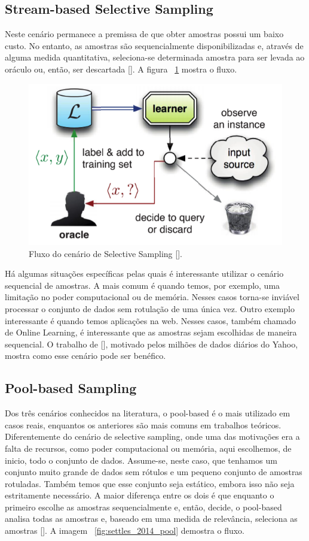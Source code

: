 \subsection{Stream-based Selective Sampling}
\label{sec:cenarios_selective_sampling}

Neste cenário permanece a premissa de que obter amostras possui um baixo custo. No entanto, as amostras são sequencialmente disponibilizadas e, através de alguma medida quantitativa, seleciona-se determinada amostra para ser levada ao oráculo ou, então, ser descartada [\cite{settles2014active}]. A figura ~\ref{fig:settles_2014_selective_sampling} mostra o fluxo. 

\begin{figure}
  \centering
  \includegraphics[width=.5\textwidth]{figures/settles_2014_selective_sampling.png}
  \caption{Fluxo do cenário de Selective Sampling [\cite{settles2014active}].}
  \label{fig:settles_2014_selective_sampling}
\end{figure}


Há algumas situações específicas pelas quais é interessante utilizar o cenário sequencial de amostras. A mais comum é quando temos, por exemplo, uma limitação no poder computacional ou de memória. Nesses casos torna-se inviável processar o conjunto de dados sem rotulação de uma única vez. Outro exemplo interessante é quando temos aplicações na web. Nesses casos, também chamado de Online Learning, é interessante que as amostras sejam escolhidas de maneira sequencial. O trabalho de [\cite{chu2011unbiased}], motivado pelos milhões de dados diários do Yahoo, mostra como esse cenário pode ser benéfico. 




\subsection{Pool-based Sampling}
\label{sec:cenarios_pool}

Dos três cenários conhecidos na literatura, o pool-based é o mais utilizado em casos reais, enquantos os anteriores são mais comuns em trabalhos teóricos. Diferentemente do cenário de selective sampling, onde uma das motivações era a falta de recursos, como poder computacional ou memória, aqui escolhemos, de inicio, todo o conjunto de dados. Assume-se, neste caso, que tenhamos um conjunto muito grande de dados sem rótulos e um pequeno conjunto de amostras rotuladas. Também temos que esse conjunto seja estático, embora isso não seja estritamente necessário. A maior diferença entre os dois é que enquanto o primeiro escolhe as amostras sequencialmente e, então, decide, o pool-based analisa todas as amostras e, baseado em uma medida de relevância, seleciona as amostras [\cite{settles2014active}]. A imagem ~\ref{fig:settles_2014_pool}  demostra o fluxo.

